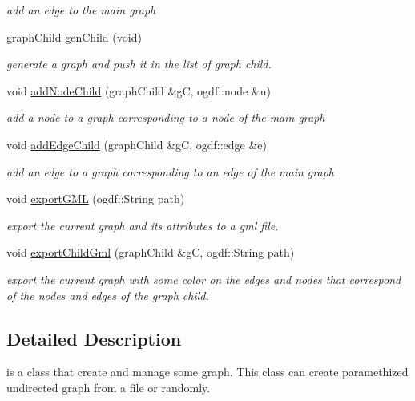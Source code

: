 \begin{DoxyCompactItemize}
\begin{DoxyCompactList}\small\item\em add an edge to the main graph \end{DoxyCompactList}\item 
graph\-Child \hyperlink{classGraphManager_a9433db8c77f8c9bd4744a35c7c553928}{gen\-Child} (void)
\begin{DoxyCompactList}\small\item\em generate a graph and push it in the list of graph child. \end{DoxyCompactList}\item 
void \hyperlink{classGraphManager_a6732352df1ad2fa1e6953759e960918d}{add\-Node\-Child} (graph\-Child \&g\-C, ogdf\-::node \&n)
\begin{DoxyCompactList}\small\item\em add a node to a graph corresponding to a node of the main graph \end{DoxyCompactList}\item 
void \hyperlink{classGraphManager_a9888881ba43a607e73791ddddad4444b}{add\-Edge\-Child} (graph\-Child \&g\-C, ogdf\-::edge \&e)
\begin{DoxyCompactList}\small\item\em add an edge to a graph corresponding to an edge of the main graph \end{DoxyCompactList}\item 
void \hyperlink{classGraphManager_a08cbf91847265d125d5b58252263306c}{export\-G\-M\-L} (ogdf\-::\-String path)
\begin{DoxyCompactList}\small\item\em export the current graph and its attributes to a gml file. \end{DoxyCompactList}\item 
void \hyperlink{classGraphManager_a706fec263f07760311b3c186daea280a}{export\-Child\-Gml} (graph\-Child \&g\-C, ogdf\-::\-String path)
\begin{DoxyCompactList}\small\item\em export the current graph with some color on the edges and nodes that correspond of the nodes and edges of the graph child. \end{DoxyCompactList}\end{DoxyCompactItemize}


\subsection{Detailed Description}
is a class that create and manage some graph. This class can create paramethized undirected graph from a file or randomly. 

